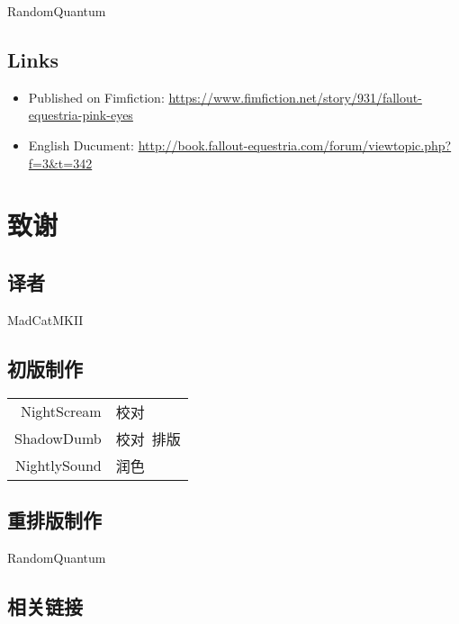 \begin{center}
    RandomQuantum
\end{center}

\section*{Links}

\begin{itemize}
    \item Published on Fimfiction: \url{https://www.fimfiction.net/story/931/fallout-equestria-pink-eyes}
    \item English Ducument: \url{http://book.fallout-equestria.com/forum/viewtopic.php?f=3\&t=342}
\end{itemize}

\chapter{致谢}

\section*{译者}

\begin{center}
    MadCatMKII
\end{center}

\section*{初版制作}

\begin{table}[ht!]
    \centering
    \begin{tabular}{rl}
        NightScream & 校对 \\
        ShadowDumb & 校对\ 排版 \\
        NightlySound & 润色 \\
    \end{tabular}
\end{table}

\section*{重排版制作}

\begin{center}
    RandomQuantum
\end{center}

\section*{相关链接}

